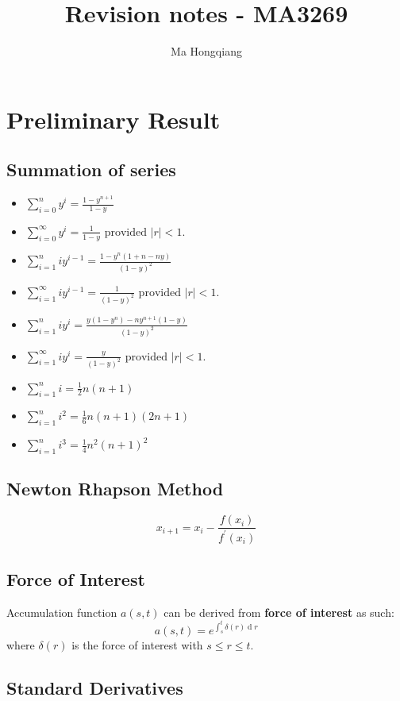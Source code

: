 \documentclass[12pt]{article}
\theoremstyle{definition}
\DeclareMathOperator{\diff}{d}
\begin{document}
\title{Revision notes - MA3269}
\author{Ma Hongqiang}
\maketitle
\tableofcontents

\clearpage
\section{Preliminary Result}
\subsection{Summation of series}
\begin{itemize}
  \item $\sum_{i=0}^n y^i = \frac{1-y^{n+1}}{1-y}$
  \item $\sum_{i=0}^\infty y^i = \frac{1}{1-y}\text{ provided }|r|<1$.
  \item $\sum_{i=1}^n iy^{i-1} = \frac{1-y^n(1+n-ny)}{(1-y)^2}$
  \item $\sum_{i=1}^\infty iy^{i-1} = \frac{1}{(1-y)^2}\text{ provided }|r|<1$.
  \item $\sum_{i=1}^n iy^{i} = \frac{y(1-y^n)-ny^{n+1}(1-y)}{(1-y)^2}$
  \item $\sum_{i=1}^\infty iy^{i} = \frac{y}{(1-y)^2}\text{ provided }|r|<1$.  
  \item $\sum_{i=1}^n i = \frac{1}{2}n(n+1)$
  \item $\sum_{i=1}^n i^2 = \frac{1}{6}n(n+1)(2n+1)$
  \item $\sum_{i=1}^n i^3 = \frac{1}{4}n^2(n+1)^2$
\end{itemize}
\subsection{Newton Rhapson Method}
\[
x_{i+1} = x_i-\frac{f(x_i)}{f^\prime(x_i)}
\]
\subsection{Force of Interest}
Accumulation function $a(s,t)$ can be derived from \textbf{force of interest} as such:
\[
a(s,t) = e^{\int_s^t \delta(r)\diff r}
\]
where $\delta(r)$ is the force of interest with $s\leq r\leq t$.
\subsection{Standard Derivatives}

\clearpage
\end{document}
